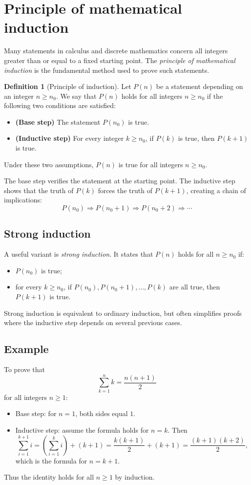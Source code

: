 \documentclass[11pt,a4paper]{article}
\theoremstyle{definition} \newtheorem{definition}{Definition} \theoremstyle{plain} \newtheorem{theorem}{Theorem}
\begin{document}
\section{Principle of mathematical induction}\label{sec:induction}
Many statements in calculus and discrete mathematics concern all integers greater than or equal to a fixed starting point. The \emph{principle of mathematical induction} is the fundamental method used to prove such statements.
\begin{definition}[Principle of induction] Let $P(n)$ be a statement depending on an integer $n\ge n_0$.
We say that $P(n)$ holds for all integers $n\ge n_0$ if the following two conditions are satisfied:
\begin{itemize}
\item \textbf{(Base step)} The statement $P(n_0)$ is true.
\item \textbf{(Inductive step)} For every integer $k\ge n_0$,
if $P(k)$ is true, then $P(k+1)$ is true. \end{itemize}
Under these two assumptions, $P(n)$ is true for all integers $n\ge n_0$. \end{definition}
The base step verifies the statement at the starting point.
The inductive step shows that the truth of $P(k)$ forces the truth of $P(k+1)$, creating a chain of implications:
\[ P(n_0) \Rightarrow P(n_0+1) \Rightarrow P(n_0+2) \Rightarrow \cdots \]
\subsection{Strong induction}
A useful variant is \emph{strong induction}.
It states that $P(n)$ holds for all $n\ge n_0$ if:
\begin{itemize}
\item $P(n_0)$ is true;
\item for every $k\ge n_0$,
if $P(n_0), P(n_0+1), \ldots, P(k)$ are all true, then $P(k+1)$ is true. \end{itemize}
Strong induction is equivalent to ordinary induction, but often simplifies proofs where the inductive step depends on several previous cases.
\subsection*{Example}
To prove that
\[ \sum_{k=1}^{n} k = \frac{n(n+1)}{2} \]
for all integers $n\ge 1$:
\begin{itemize}
\item Base step: for $n=1$, both sides equal $1$.
\item Inductive step: assume the formula holds for $n=k$. Then
\[
\sum_{i=1}^{k+1} i
= \left(\sum_{i=1}^{k} i\right) + (k+1)
= \frac{k(k+1)}{2} + (k+1)
= \frac{(k+1)(k+2)}{2},
\]
which is the formula for $n=k+1$. \end{itemize}
Thus the identity holds for all $n\ge 1$ by induction.
\clearpage
\end{document}
